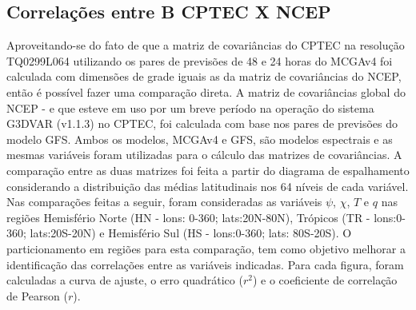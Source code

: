 

\subsection{Correlações entre B CPTEC X NCEP}
\label{sec:simi_B-cptec_ncep}

Aproveitando-se do fato de que a matriz de covariâncias do CPTEC na resolução TQ0299L064 utilizando os pares de previsões de 48 e 24 horas do MCGAv4 foi calculada com dimensões de grade iguais as da matriz de covariâncias do NCEP, então é possível fazer uma comparação direta. A matriz de covariâncias global do NCEP - e que esteve em uso por um breve período na operação do sistema G3DVAR (v1.1.3) no CPTEC, foi calculada com base nos pares de previsões do modelo GFS. Ambos os modelos, MCGAv4 e GFS, são modelos espectrais e as mesmas variáveis foram utilizadas para o cálculo das matrizes de covariâncias. A comparação entre as duas matrizes foi feita a partir do diagrama de espalhamento considerando a distribuição das médias latitudinais nos 64 níveis de cada variável. Nas comparações feitas a seguir, foram consideradas as variáveis $\psi$, $\chi$, $T$ e $q$ nas regiões Hemisfério Norte (HN - lons: 0-360; lats:20N-80N), Trópicos (TR - lons:0-360; lats:20S-20N) e Hemisfério Sul (HS - lons:0-360; lats: 80S-20S). O particionamento em regiões para esta comparação, tem como objetivo melhorar a identificação das correlações entre as variáveis indicadas. Para cada figura, foram calculadas a curva de ajuste, o erro quadrático ($r^{2}$) e o coeficiente de correlação de Pearson ($r$).

